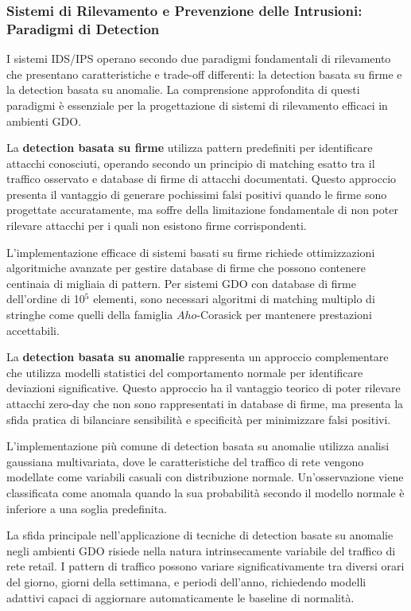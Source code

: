 {\subsubsection{Sistemi di Rilevamento e Prevenzione delle Intrusioni: Paradigmi di Detection}

I sistemi IDS/IPS operano secondo due paradigmi fondamentali di rilevamento che presentano caratteristiche e trade-off differenti: la detection basata su firme e la detection basata su anomalie. La comprensione approfondita di questi paradigmi è essenziale per la progettazione di sistemi di rilevamento efficaci in ambienti GDO.

La \textbf{detection basata su firme} utilizza pattern predefiniti per identificare attacchi conosciuti, operando secondo un principio di matching esatto tra il traffico osservato e database di firme di attacchi documentati. Questo approccio presenta il vantaggio di generare pochissimi falsi positivi quando le firme sono progettate accuratamente, ma soffre della limitazione fondamentale di non poter rilevare attacchi per i quali non esistono firme corrispondenti.

L'implementazione efficace di sistemi basati su firme richiede ottimizzazioni algoritmiche avanzate per gestire database di firme che possono contenere centinaia di migliaia di pattern. Per sistemi GDO con database di firme dell'ordine di 10$^{5}$ elementi, sono necessari algoritmi di matching multiplo di stringhe come quelli della famiglia $Aho$-Corasick per mantenere prestazioni accettabili.

La \textbf{detection basata su anomalie} rappresenta un approccio complementare che utilizza modelli statistici del comportamento normale per identificare deviazioni significative. Questo approccio ha il vantaggio teorico di poter rilevare attacchi zero-day che non sono rappresentati in database di firme, ma presenta la sfida pratica di bilanciare sensibilità e specificità per minimizzare falsi positivi.

L'implementazione più comune di detection basata su anomalie utilizza analisi gaussiana multivariata, dove le caratteristiche del traffico di rete vengono modellate come variabili casuali con distribuzione normale. Un'osservazione viene classificata come anomala quando la sua probabilità secondo il modello normale è inferiore a una soglia predefinita.

La sfida principale nell'applicazione di tecniche di detection basate su anomalie negli ambienti GDO risiede nella natura intrinsecamente variabile del traffico di rete retail. I pattern di traffico possono variare significativamente tra diversi orari del giorno, giorni della settimana, e periodi dell'anno, richiedendo modelli adattivi capaci di aggiornare automaticamente le baseline di normalità.

}
